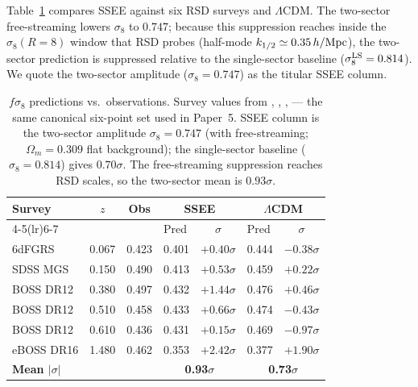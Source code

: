 \documentclass[12pt,a4paper]{article}
\newcommand{\sigls}{\sigma_8^{\rm LS}}
\begin{document}
Table~\ref{tab:fsig8} compares SSEE against six RSD surveys and $\Lambda$CDM.
The two-sector free-streaming lowers $\sigma_8$ to $0.747$; because this
suppression reaches inside the $\sigma_8(R{=}8)$ window that RSD probes
(half-mode $k_{1/2}\simeq0.35\,h/{\rm Mpc}$), the two-sector prediction is
suppressed relative to the single-sector baseline ($\sigls = 0.814$). We quote
the two-sector amplitude ($\sigma_8 = 0.747$) as the titular SSEE column.

\begin{table}[htbp]
  \centering
  \caption{$f\sigma_8$ predictions vs.\ observations. Survey values from
    \citet{Beutler2012}, \citet{Howlett2015}, \citet{Alam2017},
    \citet{Hou2021} --- the same canonical six-point set used in Paper~5.
    SSEE column is the two-sector amplitude $\sigma_8 = 0.747$ (with
    free-streaming; $\Omega_m = 0.309$ flat background); the single-sector
    baseline ($\sigma_8 = 0.814$) gives $0.70\sigma$. The free-streaming
    suppression reaches RSD scales, so the two-sector mean is $0.93\sigma$.}
  \label{tab:fsig8}
  \begin{tabularx}{\textwidth}{l c c X c X c}
    \toprule
    Survey & $z$ & Obs & \multicolumn{2}{c}{SSEE} & \multicolumn{2}{c}{$\Lambda$CDM} \\
    \cmidrule(lr){4-5}\cmidrule(lr){6-7}
    & & & Pred & $\sigma$ & Pred & $\sigma$ \\
    \midrule
    6dFGRS     & 0.067 & 0.423 & 0.401 & $+0.40\sigma$ & 0.444 & $-0.38\sigma$ \\
    SDSS MGS   & 0.150 & 0.490 & 0.413 & $+0.53\sigma$ & 0.459 & $+0.22\sigma$ \\
    BOSS DR12  & 0.380 & 0.497 & 0.432 & $+1.44\sigma$ & 0.476 & $+0.46\sigma$ \\
    BOSS DR12  & 0.510 & 0.458 & 0.433 & $+0.66\sigma$ & 0.474 & $-0.43\sigma$ \\
    BOSS DR12  & 0.610 & 0.436 & 0.431 & $+0.15\sigma$ & 0.469 & $-0.97\sigma$ \\
    eBOSS DR16 & 1.480 & 0.462 & 0.353 & $+2.42\sigma$ & 0.377 & $+1.90\sigma$ \\
    \midrule
    \multicolumn{2}{l}{\textbf{Mean $|\sigma|$}} & &
      \multicolumn{2}{c}{\textbf{0.93$\sigma$}} &
      \multicolumn{2}{c}{\textbf{0.73$\sigma$}} \\
    \bottomrule
  \end{tabularx}
\end{table}
\end{document}
